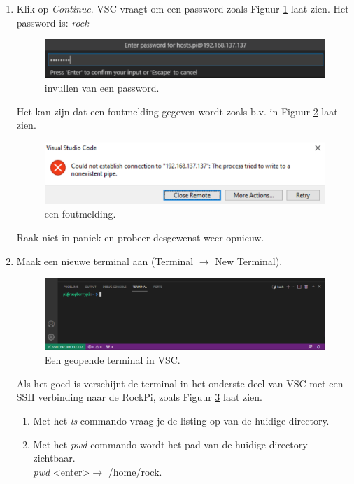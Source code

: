 \begin{enumerate}
\begin{enumerate}
	     \item Klik op \textit{Continue}. VSC vraagt om een password zoals Figuur \ref{fig:vscVrPasswd} laat zien. Het password is: \textit{rock} 
		    \begin{figure}[h!]
	\captionsetup{justification=centering}
	\includegraphics[width=0.7 \linewidth]{figuren/VSCpasswd}
	\centering
	\caption{invullen van een password.}
	\label{fig:vscVrPasswd}
\end{figure}	

Het kan zijn dat een foutmelding gegeven wordt zoals b.v. in Figuur \ref{fig:vscfout1} laat zien. 
		    \begin{figure}[h!]
	\captionsetup{justification=centering}
	\includegraphics[width=0.6 \linewidth]{figuren/VSCfout1}
	\centering
	\caption{een foutmelding.}
	\label{fig:vscfout1}
\end{figure}	
Raak niet in paniek en probeer desgewenst weer opnieuw.
\item Maak een nieuwe terminal aan (Terminal $\rightarrow$ New Terminal). 
\begin{figure}[h!]
	\captionsetup{justification=centering}
	\includegraphics[width=0.6 \linewidth]{figuren/VSCnewTerminal}
	\centering
	\caption{Een geopende terminal in VSC.}
	\label{fig:vscnewTerm}
\end{figure}	
Als het goed is verschijnt de terminal in het onderste deel van VSC met een SSH verbinding naar de RockPi, zoals Figuur \ref{fig:vscnewTerm} laat zien. 
\begin{enumerate}
	\item Met het \textit{ls} commando vraag je de listing op van de huidige directory.
	\item Met het \textit{pwd} commando wordt het pad van de huidige directory zichtbaar.\\
	\textit{pwd} \textless enter\textgreater $\rightarrow$  /home/rock.

\end{enumerate}
\end{enumerate}
\end{enumerate}
